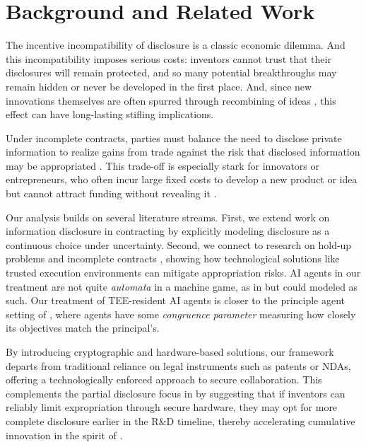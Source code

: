 \section{Background and Related Work}
The incentive incompatibility of disclosure is a classic economic dilemma. And this incompatibility imposes serious costs: inventors cannot trust that their disclosures will remain protected, and so many potential breakthroughs may remain hidden or never be developed in the first place. And, since new innovations themselves are often spurred through recombining of ideas \citep{fleming2001recombinant}, this effect can have long-lasting stifling implications.

Under incomplete contracts, parties must balance the need to disclose private information to realize gains from trade against the risk that disclosed information may be appropriated \citep{arrow1972economic}. This trade-off is especially stark for innovators or entrepreneurs, who often incur large fixed costs to develop a new product or idea but cannot attract funding without revealing it \citep{nelson1959simple}. 

Our analysis builds on several literature streams. First, we extend work on information disclosure in contracting \citep{crawford1982strategic, okuno1991incentive} by explicitly modeling disclosure as a continuous choice under uncertainty. Second, we connect to research on hold-up problems and incomplete contracts \citep{hart1988incomplete, aghion1992innovation, grossman1986disclosure, bernheim1987sequential, anton1994expropriation}, showing how technological solutions like trusted execution environments can mitigate appropriation risks.  AI agents in our treatment are not quite \emph{automata} in a machine game, as in \citet{rubinstein1986finite} but could modeled as such. Our treatment of TEE-resident AI agents is closer to the principle agent setting of \citet{aghion1997formal}, where agents have some \emph{congruence parameter} measuring how closely its objectives match the principal’s.

By introducing cryptographic and hardware-based solutions, our framework departs from traditional reliance on legal instruments such as patents or NDAs, offering a technologically enforced approach to secure collaboration. This complements the partial disclosure focus in \citet{anton1994expropriation, anton2002sale} by suggesting that if inventors can reliably limit expropriation through secure hardware, they may opt for more complete disclosure earlier in the R\&D timeline, thereby accelerating cumulative innovation in the spirit of \citet{Scotchmer1999}.


